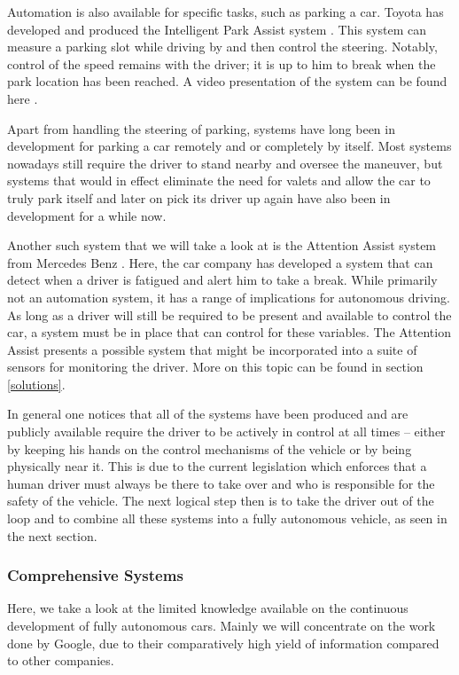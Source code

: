 \documentclass{acm_proc_article-sp}
\begin{document}
Automation is also available for specific tasks, such as parking a car.
Toyota has developed and produced the Intelligent Park Assist system \cite{www:toyota_i_park_assist}.
This system can measure a parking slot while driving by and then control the steering.
Notably, control of the speed remains with the driver; it is up to him to break when the park location has been reached.
A video presentation of the system can be found here \cite{www:toyota_ipa_video}.

Apart from handling the steering of parking, systems have long been in development for parking a car remotely and or completely by itself.
Most systems nowadays still require the driver to stand nearby and oversee the maneuver, but systems that would in effect eliminate the need for valets and allow the car to truly park itself and later on pick its driver up again have also been in development for a while now.

Another such system that we will take a look at is the Attention Assist system from Mercedes Benz \cite{www:mercedes_attention_assist}.
Here, the car company has developed a system that can detect when a driver is fatigued and alert him to take a break.
While primarily not an automation system, it has a range of implications for autonomous driving.
As long as a driver will still be required to be present and available to control the car, a system must be in place that can control for these variables.
The Attention Assist presents a possible system that might be incorporated into a suite of sensors for monitoring the driver.
More on this topic can be found in section \ref{solutions}.

In general one notices that all of the systems have been produced and are publicly available require the driver to be actively in control at all times – either by keeping his hands on the control mechanisms of the vehicle or by being physically near it.
This is due to the current legislation which enforces that a human driver must always be there to take over and who is responsible for the safety of the vehicle.
The next logical step then is to take the driver out of the loop and to combine all these systems into a fully autonomous vehicle, as seen in the next section.

\subsubsection{Comprehensive Systems}
\label{comprehensive_systems}

Here, we take a look at the limited knowledge available on the continuous development of fully autonomous cars.
Mainly we will concentrate on the work done by Google, due to their comparatively high yield of information compared to other companies.
\end{document}
